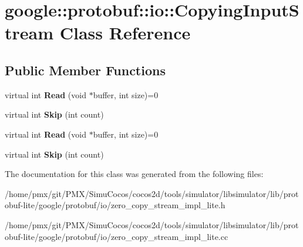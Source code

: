 \hypertarget{classgoogle_1_1protobuf_1_1io_1_1CopyingInputStream}{}\section{google\+:\+:protobuf\+:\+:io\+:\+:Copying\+Input\+Stream Class Reference}
\label{classgoogle_1_1protobuf_1_1io_1_1CopyingInputStream}
\subsection*{Public Member Functions}
\begin{DoxyCompactItemize}
\item 
\mbox{\label{classgoogle_1_1protobuf_1_1io_1_1CopyingInputStream_a810b433789e8a26cc03b9843ca4b4242}} 
virtual int {\bfseries Read} (void $\ast$buffer, int size)=0
\item 
\mbox{\label{classgoogle_1_1protobuf_1_1io_1_1CopyingInputStream_ab5942ac9afecda5e75ad89473e90497a}} 
virtual int {\bfseries Skip} (int count)
\item 
\mbox{\label{classgoogle_1_1protobuf_1_1io_1_1CopyingInputStream_a810b433789e8a26cc03b9843ca4b4242}} 
virtual int {\bfseries Read} (void $\ast$buffer, int size)=0
\item 
\mbox{\label{classgoogle_1_1protobuf_1_1io_1_1CopyingInputStream_afc7dd5624bd17f6e5fe4eb704fa84bfd}} 
virtual int {\bfseries Skip} (int count)
\end{DoxyCompactItemize}


The documentation for this class was generated from the following files\+:\begin{DoxyCompactItemize}
\item 
/home/pmx/git/\+P\+M\+X/\+Simu\+Cocos/cocos2d/tools/simulator/libsimulator/lib/protobuf-\/lite/google/protobuf/io/zero\+\_\+copy\+\_\+stream\+\_\+impl\+\_\+lite.\+h\item 
/home/pmx/git/\+P\+M\+X/\+Simu\+Cocos/cocos2d/tools/simulator/libsimulator/lib/protobuf-\/lite/google/protobuf/io/zero\+\_\+copy\+\_\+stream\+\_\+impl\+\_\+lite.\+cc\end{DoxyCompactItemize}
